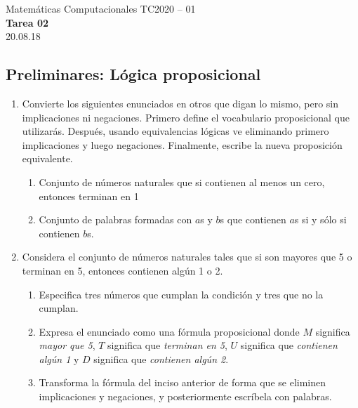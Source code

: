 \documentclass[]{book}
\theoremstyle{definition}
\begin{document}
\begin{center}
{\huge Matemáticas Computacionales TC2020 -- 01}\\[1.5ex]
{\large \textbf{Tarea 02}\\[1.5ex] %
20.08.18} %
\end{center}

\vspace{0.2 cm}

\subsection*{Preliminares: Lógica proposicional}

\begin{enumerate}
	\itemsep0.35in

	\item Convierte los siguientes enunciados en otros que digan lo mismo, pero sin implicaciones ni negaciones.
	Primero define el vocabulario proposicional que utilizarás. Después, usando equivalencias lógicas ve eliminando primero implicaciones y luego negaciones.
	Finalmente, escribe la nueva proposición equivalente.
	\begin{enumerate}
		\item Conjunto de números naturales que si contienen al menos un cero, entonces terminan en 1
		\item Conjunto de palabras formadas con $a$s y $b$s que contienen $a$s si y sólo si contienen $b$s.
	\end{enumerate}
	\item Considera el conjunto de números naturales tales que si son mayores que 5 o terminan en 5, entonces contienen algún 1 o 2.
	\begin{enumerate}
		\item Especifica tres números que cumplan la condición y tres que no la cumplan.
		\item Expresa el enunciado como una fórmula proposicional donde $M$ significa \textit{mayor que 5}, $T$ significa que \textit{terminan en 5}, $U$ significa que \textit{contienen algún 1} y $D$ significa que \textit{contienen algún 2}.
		\item Transforma la fórmula del inciso anterior de forma que se eliminen implicaciones y negaciones, y posteriormente escríbela con palabras.
	\end{enumerate}
	\end{enumerate}
\end{document}
